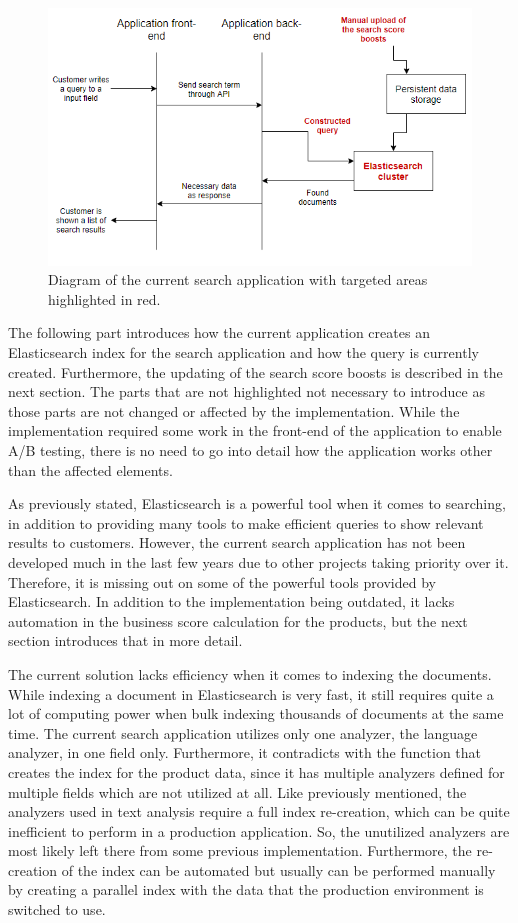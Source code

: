 \begin{figure}
    \centering
    \includegraphics[width=\textwidth]{img/current-solution.png}
    \caption{Diagram of the current search application with targeted areas highlighted in red.}
    \label{fig:current-solution}
\end{figure}


The following part introduces how the current application creates an Elasticsearch index for the search application 
and how the query is currently created. 
Furthermore, the updating of the search score boosts is described in the next section.
The parts that are not highlighted not necessary to introduce as those parts are not changed or affected 
by the implementation.
While the implementation required some work in the front-end of the application to enable A/B testing, 
there is no need to go into detail how the application works other than the affected elements.


As previously stated, Elasticsearch is a powerful tool when it comes to searching, in addition to providing many  
tools to make efficient queries to show relevant results to customers.
However, the current search application has not been developed much in the last few years 
due to other projects taking priority over it. 
Therefore, it is missing out on some of the powerful tools provided by Elasticsearch.
In addition to the implementation being outdated, 
it lacks automation in the business score calculation for the products, 
but the next section introduces that in more detail.


The current solution lacks efficiency when it comes to indexing the documents. 
While indexing a document in Elasticsearch is very fast, it still requires quite a lot of computing 
power when bulk indexing thousands of documents at the same time. 
The current search application utilizes only one analyzer, the language analyzer, in one field only.
Furthermore, it contradicts with the function that creates the index for the product data, since it has
multiple analyzers defined for multiple fields which are not utilized at all.
Like previously mentioned, the analyzers used in text analysis require a full index re-creation, 
which can be quite inefficient to perform in a production application.
So, the unutilized analyzers are most likely left there from some previous implementation.
Furthermore, the re-creation of the index can be automated but usually can be performed manually by creating
a parallel index with the data that the production environment is switched to use.


